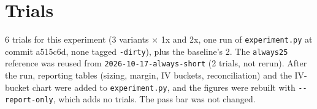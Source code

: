 \documentclass{article}
\begin{document}
\section{Trials}

6 trials for this experiment (3 variants \ensuremath{\times} 1x and 2x, one run of \texttt{experiment.\allowbreak{}py} at commit a515c6d, none tagged \texttt{-\allowbreak{}dirty}), plus the baseline's 2. The \texttt{always25} reference was reused from \texttt{2026-\allowbreak{}10-\allowbreak{}17-\allowbreak{}always-\allowbreak{}short} (2 trials, not rerun). After the run, reporting tables (sizing, margin, IV buckets, reconciliation) and the IV-bucket chart were added to \texttt{experiment.\allowbreak{}py}, and the figures were rebuilt with \texttt{-\allowbreak{}-\allowbreak{}report-\allowbreak{}only}, which adds no trials. The pass bar was not changed.
\end{document}
